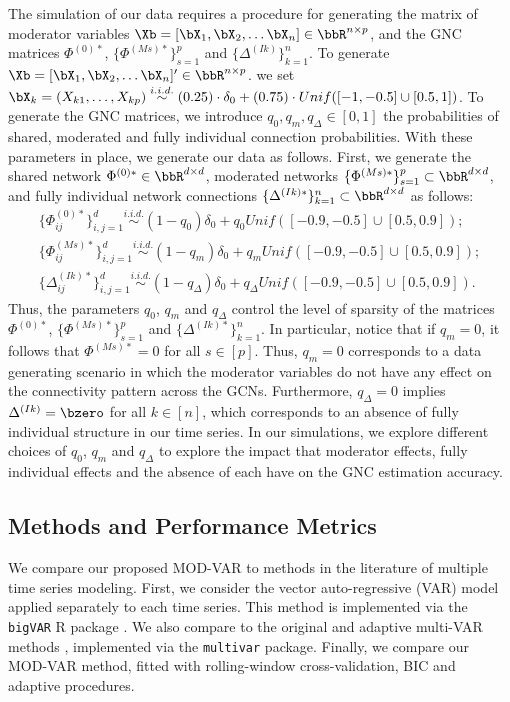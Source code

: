 The simulation of our data requires a procedure for generating the matrix of moderator variables $\Xb = [\bX_1, \bX_2,\ldots \bX_{n}]\in\bbR^{n \times p}$, and the GNC matrices $\Phi^{(0)*}$, $\{\Phi^{(Ms)*}\}_{s=1}^p$ and $\{\Delta^{(Ik)}\}_{k=1}^n$. To generate $\Xb= [\bX_1, \bX_2,\ldots \bX_{n}]'\in\bbR^{n\times p}$. we set $\bX_{k} = (X_{k1},\ldots ,X_{kp}) \stackrel{i.i.d.}{\sim} (0.25)\cdot\delta_0 + (0.75) \cdot Unif([-1,-0.5]\cup [0.5, 1])$. To generate the GNC matrices, we introduce $q_{0}, q_{m}, q_{\Delta}\in[0,1]$ the probabilities of shared, moderated and fully individual connection probabilities. With these parameters in place, we generate our data as follows. First, we generate the shared network  $\Phi^{(0)*}\in\bbR^{d\times d}$, moderated networks  $\{\Phi^{(Ms)*}\}_{s=1}^p \subset\bbR^{d\times d}$, and fully individual network connections $\{\Delta^{(Ik)*}\}_{k=1}^n \subset \bbR^{d\times d}$ as follows:
\begin{align*}
	\{\Phi^{(0)*}_{ij}\}_{i,j=1}^d \stackrel{i.i.d.}{\sim} (1-q_{0}) \delta_0 + q_{0} Unif([-0.9,-0.5]\cup [0.5,0.9]);\\
	\{\Phi^{(Ms)*}_{ij}\}_{i,j=1}^d \stackrel{i.i.d.}{\sim} (1-q_{m}) \delta_0 + q_{m} Unif([-0.9,-0.5]\cup [0.5,0.9]);\\
	\{\Delta^{(Ik)*}_{ij}\}_{i,j=1}^d \stackrel{i.i.d.}{\sim} (1-q_{\Delta}) \delta_0 + q_{\Delta} Unif([-0.9,-0.5]\cup [0.5,0.9]).
\end{align*}
Thus, the parameters $q_0$, $q_m$ and $q_\Delta$ control the level of sparsity of the matrices $\Phi^{(0)*}$, $\{\Phi^{(Ms)*}\}_{s=1}^p$ and $\{\Delta^{(Ik)*}\}_{k=1}^n$. In particular, notice that if $q_{m} = 0$, it follows that $\Phi^{(Ms)*} = 0$ for all $s\in[p]$. Thus, $q_{m} = 0$ corresponds to a data generating scenario in which the moderator variables do not have any effect on the connectivity pattern across the GCNs. Furthermore, $q_{\Delta} = 0$ implies $\Delta^{(Ik)} = \bzero$ for all $k\in[n]$, which corresponds to an absence of fully individual structure in our time series. In our simulations, we explore different choices of $q_{0}$, $q_m$ and $q_\Delta$ to explore the impact that moderator effects, fully individual effects and the absence of each have on the GNC estimation accuracy.

\subsection{Methods and Performance Metrics}

We compare our proposed MOD-VAR to methods in the literature of multiple time series modeling. First, we consider the vector auto-regressive (VAR) model \citep{basu2015regularized} applied separately to each time series. This method is implemented via the \texttt{bigVAR} R package \citep{nicholson2023bigVAR}. We also compare to the original and adaptive multi-VAR methods \citep{fisher2022penalized}, implemented via the \texttt{multivar} package. Finally, we compare our MOD-VAR method, fitted with rolling-window cross-validation, BIC and adaptive procedures. 

